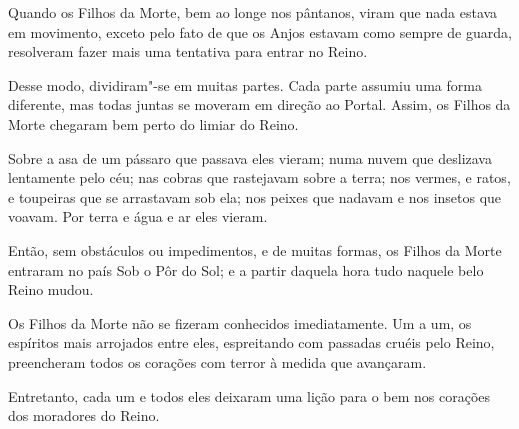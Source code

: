 Quando os Filhos da Morte, bem ao longe nos pântanos, viram que nada
estava em movimento, exceto pelo fato de que os Anjos estavam como
sempre de guarda, resolveram fazer mais uma tentativa para entrar no
Reino.

Desse modo, dividiram"-se em muitas partes. Cada parte assumiu uma forma
diferente, mas todas juntas se moveram em direção ao Portal. Assim, os
Filhos da Morte chegaram bem perto do limiar do Reino.

Sobre a asa de um pássaro que passava eles vieram; numa nuvem que
deslizava lentamente pelo céu; nas cobras que rastejavam sobre a terra;
nos vermes, e ratos, e toupeiras que se arrastavam sob ela; nos peixes
que nadavam e nos insetos que voavam. Por terra e água e ar eles vieram.

Então, sem obstáculos ou impedimentos, e de muitas formas, os Filhos da
Morte entraram no país Sob o Pôr do Sol; e a partir daquela hora tudo
naquele belo Reino mudou.

Os Filhos da Morte não se fizeram conhecidos imediatamente. Um a um, os
espíritos mais arrojados entre eles, espreitando com passadas cruéis
pelo Reino, preencheram todos os corações com terror à medida que
avançaram.

Entretanto, cada um e todos eles deixaram uma lição para o bem nos
corações dos moradores do Reino.
